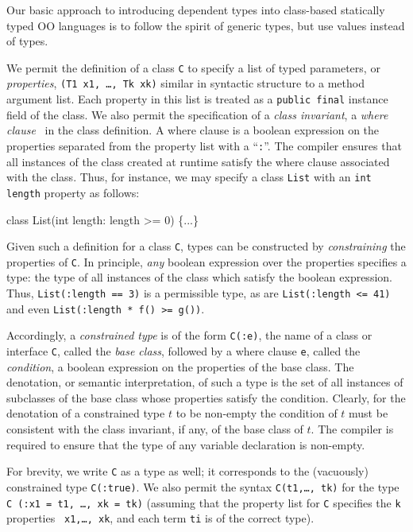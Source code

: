 Our basic approach to introducing dependent types into
class-based statically typed OO languages is to
follow the spirit of generic types, but use values instead of
types.

We permit the definition of a class {\tt C} to specify
a list of typed parameters, or {\em properties},
{\tt (T1 x1, \ldots, Tk xk)} similar in syntactic structure to
a method argument list. Each
property in this list is treated as a {\tt public final} instance
field of the class.
We also permit the
specification of a {\em class invariant}, a
{\em where clause}~\cite{where-clauses}
in the class definition. A where
clause is a boolean expression on the properties separated from the
property list with a ``{\tt :}''.  The compiler ensures that all
instances of the class created at runtime satisfy the where clause
associated with the class.
Thus, for instance, we may specify a class {\tt List} with an
{\tt int length} property as follows:
{\footnotesize
\begin{code}
  class List(int length: length >= 0) \{...\}
\end{code}}

Given such a definition for a class {\tt C},
types can be constructed by {\em constraining} the properties of
{\tt C}.
In principle, {\em any} boolean expression over the
properties specifies a type: the type of all instances of the
class which satisfy the boolean expression. Thus,
{\tt List(:length == 3)} is a permissible type, as are
{\tt List(:length <= 41)} and even
{\tt List(:length * f() >= g())}.


Accordingly, a {\em constrained type} is of the form {\tt C(:e)}, the name of
a class or interface {\tt C}, called the {\em base class}, followed by a
where clause {\tt e}, called the {\em condition}, a boolean expression
on the properties of the base class. 
The denotation, or
semantic interpretation, of such a type is the set of all instances
of subclasses of the base class whose properties satisfy the
condition.
Clearly, for the denotation of a constrained type $t$ to be
non-empty the condition of $t$ must be consistent with the class
invariant, if any, of the base class of $t$.  The compiler is required to
ensure that the type of any variable declaration is non-empty.

For brevity, we write {\tt C} as a type as well; it
corresponds to the (vacuously) constrained type {\tt C(:true)}.
We also permit the syntax {\tt C(t1,\ldots, tk)} for
the type {\tt C (:x1 = t1, \ldots, xk = tk)} (assuming that
the property list for {\tt C} specifies the {\tt k} properties {\tt
x1,\ldots, xk}, and each term {\tt ti} is of the correct
type). 

